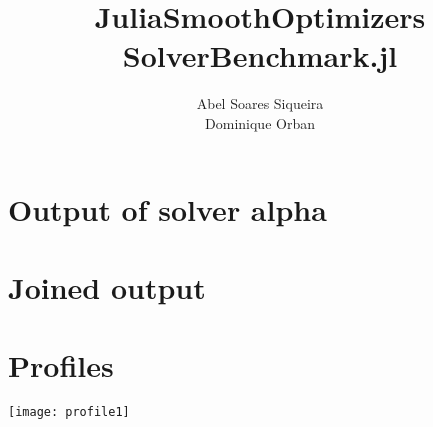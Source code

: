\documentclass[12pt]{article}
\title{
	JuliaSmoothOptimizers \\ SolverBenchmark.jl
}
\author{
	Abel Soares Siqueira \\ Dominique Orban
}
\date{ }
\begin{document}
\maketitle

\section*{Output of solver alpha}



\section*{Joined output}



\section*{Profiles}

\begin{center}
  \texttt{[image: profile1]}
\end{center}
\end{document}
